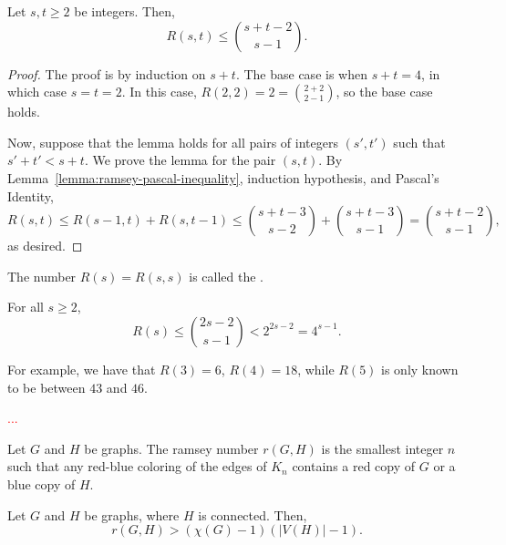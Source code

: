 \begin{lemma} \label{lemma:ramsey-binom-inequality}
    Let \(s, t \geq 2\) be integers.
    Then,
    \begin{equation}
        R(s, t) \leq \binom{s + t - 2}{s - 1}.
    \end{equation}
\end{lemma}

\begin{proof}
    The proof is by induction on \(s + t\).
    The base case is when \(s + t = 4\), in which case \(s = t = 2\).
    In this case, \(R(2, 2) = 2 = \binom{2 + 2}{2 - 1}\), so the base case holds.

    Now, suppose that the lemma holds for all pairs of integers \((s', t')\) such that \(s' + t' < s + t\).
    We prove the lemma for the pair \((s, t)\).
    By Lemma~\ref{lemma:ramsey-pascal-inequality}, induction hypothesis, and Pascal's Identity,
    \begin{equation}
        R(s, t) \leq R(s - 1, t) + R(s, t - 1)
        \leq \binom{s + t - 3}{s - 2} + \binom{s + t - 3}{s - 1}
        = \binom{s + t - 2}{s - 1},
    \end{equation}
    as desired.
\end{proof}

The number \(R(s) = R(s, s)\) is called the .

\begin{corollary}
    For all \(s \geq 2\),
    \begin{equation}
        R(s) \leq \binom{2s - 2}{s - 1} < 2^{2s - 2} = 4^{s - 1}.
    \end{equation}
\end{corollary}

For example, we have that \(R(3) = 6\), \(R(4) = 18\), while \(R(5)\) is only known to be between \(43\) and \(46\).

\textcolor{red}{...}

\begin{definition}
    Let \(G\) and \(H\) be graphs.
    The ramsey number \(r(G, H)\) is the smallest integer \(n\)
    such that any red-blue coloring of the edges of \(K_n\)
    contains a red copy of \(G\) or a blue copy of \(H\).
\end{definition}

\begin{theorem} \label{thm:rGH-lower-bound}
    Let \(G\) and \(H\) be graphs, where \(H\) is connected.
    Then,
    \begin{equation}
        r(G, H) > (\chi(G) - 1)(|V(H)| - 1).
    \end{equation}
\end{theorem}

